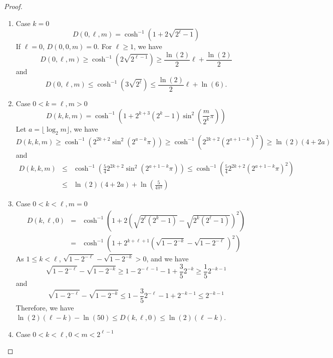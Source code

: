 \documentclass[11pt]{article}
\begin{document}
\begin{proof}
\begin{enumerate}
\item Case $k=0$
\[ D(0, \ell, m) = \cosh^{-1}(1 + 2\sqrt{2^{\ell}-1}) \]
If $\ell=0$, $D(0,0,m)=0$. For $\ell \geq 1$, we have
\[ D(0, \ell, m) \geq \cosh^{-1}(2\sqrt{2^{\ell-1}}) \geq \frac{\ln(2)}{2}\ell + \frac{\ln(2)}{2} \]
and
\[ D(0, \ell, m) \leq \cosh^{-1}(3\sqrt{2^{\ell}}) \leq \frac{\ln(2)}{2}\ell + \ln(6). \]
\item Case $0<k=\ell, m>0$
\[ D(k, k, m) = \cosh^{-1}(1 + 2^{k+3}(2^{k}-1)\sin^{2}(\frac{m}{2^{k}}\pi)) \]
Let $a = \lfloor \log_2 m \rfloor$, we have
\[ D(k, k, m) \geq \cosh^{-1}(2^{2k+2} \sin^{2}(2^{a-k}\pi)) \geq \cosh^{-1}(2^{2k+2}(2^{a+1-k})^{2}) \geq \ln(2)(4 + 2a) \]
and
\begin{eqnarray*}
D(k, k, m)&\leq &\cosh^{-1}(\frac{5}{4} 2^{2k+2} \sin^{2}(2^{a+1-k}\pi)) \leq \cosh^{-1}(\frac{5}{4} 2^{2k+2} (2^{a+1-k}\pi)^{2}) \\
&\leq &\ln(2)(4 + 2a) + \ln(\frac{5}{4\pi^{2}})
\end{eqnarray*}
\item Case $0 < k < \ell, m=0$
\begin{eqnarray*}
D(k, \ell, 0) &=& \cosh^{-1}(1 + 2(\sqrt{2^{\ell}(2^{k}-1)} - \sqrt{2^{k}(2^{\ell}-1)})^{2}) \\
& = &\cosh^{-1}(1 + 2^{k + \ell + 1}(\sqrt{1 - 2^{-k}} - \sqrt{1 - 2^{-\ell}})^{2})
\end{eqnarray*}
As $1 \leq k < \ell$, $\sqrt{1 - 2^{-\ell}} - \sqrt{1 - 2^{-k}} > 0$, and we have
\[ \sqrt{1 - 2^{-\ell}} - \sqrt{1 - 2^{-k}} \geq 1 - 2^{-\ell-1} - 1 + \frac{3}{5}2^{-k} \geq \frac{1}{5}2^{-k-1} \]
and
\[ \sqrt{1 - 2^{-\ell}} - \sqrt{1 - 2^{-k}} \leq 1 - \frac{3}{5}2^{-\ell} - 1 + 2^{-k-1} \leq 2^{-k-1} \]
Therefore, we have $ \ln(2)(\ell - k) - \ln(50) \leq D(k, \ell, 0) \leq \ln(2)(\ell - k) $.
\item Case $0 < k < \ell, 0 < m < 2^{\ell-1}$


\end{enumerate}
\end{proof}
\end{document}
